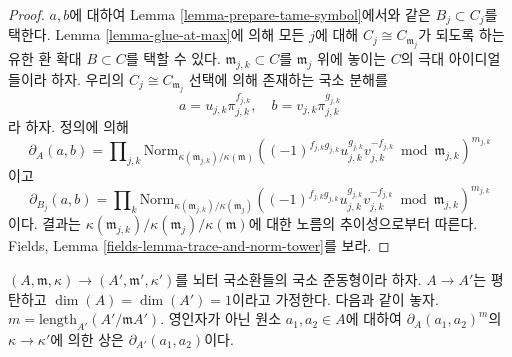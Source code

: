 \begin{proof}
$a, b$에 대하여 Lemma \ref{lemma-prepare-tame-symbol}에서와 같은
$B_j \subset C_j$를 택한다. Lemma \ref{lemma-glue-at-max}에 의해 모든
$j$에 대해 $C_j \cong C_{\mathfrak m_j}$가 되도록 하는 유한 환 확대
$B \subset C$를 택할 수 있다. $\mathfrak m_{j, k} \subset C$를
$\mathfrak m_j$ 위에 놓이는 $C$의 극대 아이디얼들이라 하자. 우리의
$C_j \cong C_{\mathfrak m_j}$ 선택에 의해 존재하는 국소 분해를
$$
a = u_{j, k}\pi_{j, k}^{f_{j, k}},\quad
b = v_{j, k}\pi_{j, k}^{g_{j, k}}
$$
라 하자. 정의에 의해
$$
\partial_A(a, b) = 
\prod\nolimits_{j, k}
\text{Norm}_{\kappa(\mathfrak m_{j, k})/\kappa(\mathfrak m)}
((-1)^{f_{j, k}g_{j, k}}u_{j, k}^{g_{j, k}}v_{j, k}^{-f_{j, k}}
\bmod \mathfrak m_{j, k})^{m_{j, k}}
$$
이고
$$
\partial_{B_j}(a, b) = 
\prod\nolimits_k
\text{Norm}_{\kappa(\mathfrak m_{j, k})/\kappa(\mathfrak m_j)}
((-1)^{f_{j, k}g_{j, k}}u_{j, k}^{g_{j, k}}v_{j, k}^{-f_{j, k}}
\bmod \mathfrak m_{j, k})^{m_{j, k}}
$$
이다. 결과는
$\kappa(\mathfrak m_{j, k})/\kappa(\mathfrak m_j)/\kappa(\mathfrak m)$에
대한 노름의 추이성으로부터 따른다. Fields, Lemma
\ref{fields-lemma-trace-and-norm-tower}를 보라.
\end{proof}
\begin{lemma}
\label{lemma-tame-symbol-formally-smooth}
$(A, \mathfrak m, \kappa) \to (A', \mathfrak m', \kappa')$를 뇌터
국소환들의 국소 준동형이라 하자. $A \to A'$는 평탄하고
$\dim(A) = \dim(A') = 1$이라고 가정한다. 다음과 같이 놓자.
$m = \text{length}_{A'}(A'/\mathfrak mA')$.
영인자가 아닌 원소 $a_1, a_2 \in A$에 대하여
$\partial_A(a_1, a_2)^m$의 $\kappa \to \kappa'$에 의한 상은
$\partial_{A'}(a_1, a_2)$이다.
\end{lemma}

